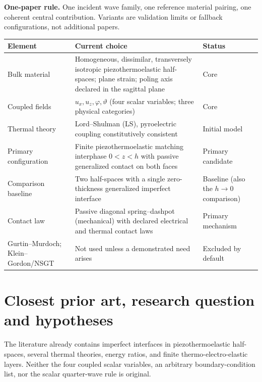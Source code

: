 \documentclass[11pt]{article}
\begin{document}
\textbf{One-paper rule.} One incident wave family, one reference material
pairing, one coherent central contribution. Variants are validation limits or
fallback configurations, not additional papers.

\begin{center}
\begin{tabular}{@{}p{}p{}p{}@{}}
\toprule
\textbf{Element} & \textbf{Current choice} & \textbf{Status} \\
\midrule
Bulk material & Homogeneous, dissimilar, transversely isotropic
  piezothermoelastic half-spaces; plane strain; poling axis declared in the
  sagittal plane & Core \\
Coupled fields & $u_x, u_z, \varphi, \vartheta$ (four scalar variables; three
  physical categories) & Core \\
Thermal theory & Lord--Shulman (LS), pyroelectric coupling constitutively
  consistent & Initial model \\
Primary configuration & Finite piezothermoelastic matching interphase
  $0<z<h$ with passive generalized contact on both faces & Primary candidate \\
Comparison baseline & Two half-spaces with a single zero-thickness generalized
  imperfect interface & Baseline (also the $h\to0$ comparison) \\
Contact law & Passive diagonal spring--dashpot (mechanical) with declared
  electrical and thermal contact laws & Primary mechanism \\
Gurtin--Murdoch; Klein--Gordon/NSGT & Not used unless a demonstrated need
  arises & Excluded by default \\
\bottomrule
\end{tabular}
\end{center}

\section{Closest prior art, research question and hypotheses}

The literature already contains imperfect interfaces in piezothermoelastic
half-spaces, several thermal theories, energy ratios, and finite
thermo-electro-elastic layers. Neither the four coupled scalar variables, an
arbitrary boundary-condition list, nor the scalar quarter-wave rule is original.
\end{document}
